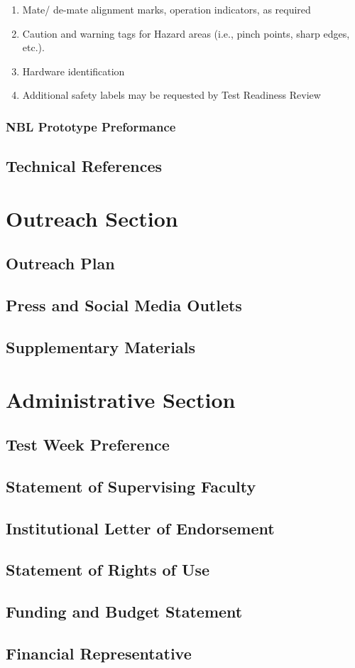 \documentclass{article}
\begin{document}
\begin{enumerate}
\begin{enumerate}
        \begin{enumerate}
            \item Mate/ de-mate alignment marks, operation indicators, as required
            \item Caution and warning tags for Hazard areas (i.e., pinch points, sharp edges, etc.).
            \item Hardware identification
            \item Additional safety labels may be requested by Test Readiness Review
        \end{enumerate}
    \end{enumerate}
\end{enumerate}
\subsubsection{NBL Prototype Preformance}
\subsection{Technical References}


\section{Outreach Section}
\subsection{Outreach Plan}
\subsection{Press and Social Media Outlets}
\subsection{Supplementary Materials}


\section{Administrative Section}
\subsection{Test Week Preference}
\subsection{Statement of Supervising Faculty}
\subsection{Institutional Letter of Endorsement}
\subsection{Statement of Rights of Use}
\subsection{Funding and Budget Statement}
\subsection{Financial Representative}
\end{document}
